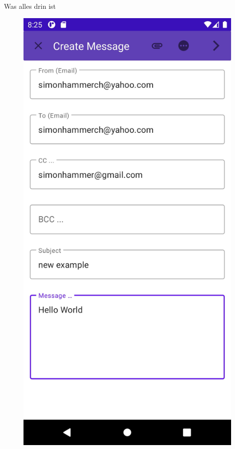 \documentclass[aspectratio=169]{beamer}
\begin{document}
\begin{frame}{Was alles drin ist}
\begin{figure}[h]
        \pause
        \includegraphics[height=.8\textheight]{media/emailWriter.jpg}
        \pause

\end{figure}
\end{frame}
\end{document}
